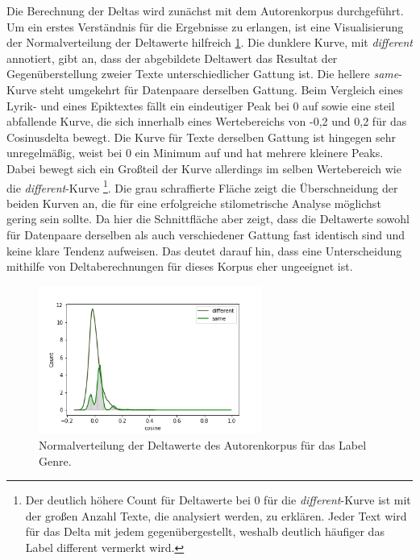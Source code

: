 \documentclass[a4paper,10p]{article}
\begin{document}
Die Berechnung der Deltas wird zunächst mit dem Autorenkorpus durchgeführt. Um ein erstes Verständnis für die Ergebnisse zu erlangen, ist eine Visualisierung der Normalverteilung der Deltawerte hilfreich \ref{fig:normalverteilung_genre}. Die dunklere Kurve, mit \textit{different} annotiert, gibt an, dass der abgebildete Deltawert das Resultat der Gegenüberstellung zweier Texte unterschiedlicher Gattung ist. Die hellere \textit{same}-Kurve steht umgekehrt für Datenpaare derselben Gattung. Beim Vergleich eines Lyrik- und eines Epiktextes fällt ein eindeutiger Peak bei 0 auf sowie eine steil abfallende Kurve, die sich innerhalb eines Wertebereichs von -0,2 und 0,2 für das Cosinusdelta bewegt. Die Kurve für Texte derselben Gattung ist hingegen sehr unregelmäßig, weist bei 0 ein Minimum auf und hat mehrere kleinere Peaks. Dabei bewegt sich ein Großteil der Kurve allerdings im selben Wertebereich wie die \textit{different}-Kurve \footnote{Der deutlich höhere Count für Deltawerte bei 0 für die \textit{different}-Kurve ist mit der großen Anzahl Texte, die analysiert werden, zu erklären. Jeder Text wird für das Delta mit jedem gegenübergestellt, weshalb deutlich häufiger das Label \glqq different \grqq vermerkt wird.}. Die grau schraffierte Fläche zeigt die Überschneidung der beiden Kurven an, die für eine erfolgreiche stilometrische Analyse möglichst gering sein sollte. Da hier die Schnittfläche aber zeigt, dass die Deltawerte sowohl für Datenpaare derselben als auch verschiedener Gattung fast identisch sind und keine klare Tendenz aufweisen. Das deutet darauf hin, dass eine Unterscheidung mithilfe von Deltaberechnungen für dieses Korpus eher ungeeignet ist. \par 

\begin{figure}
	\includegraphics[width=0.65\textwidth]{autoren_delta_samedif_genre.png}
	\caption{Normalverteilung der Deltawerte des Autorenkorpus für das Label Genre.}
	\label{fig:normalverteilung_genre}
	\end{figure}
		
\end{document}
